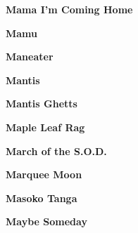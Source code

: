 \begin{center}\textbf{Mama I'm Coming Home}\end{center}
\newline
\vspace{10pt} 
\begin{center}\textbf{Mamu}\end{center}
\newline
\vspace{10pt} 
\begin{center}\textbf{Maneater}\end{center}
\newline
\vspace{10pt} 
\begin{center}\textbf{Mantis}\end{center}
\newline
\vspace{10pt} 
\begin{center}\textbf{Mantis Ghetts}\end{center}
\newline
\vspace{10pt} 
\begin{center}\textbf{Maple Leaf Rag}\end{center}
\newline
\vspace{10pt} 
\begin{center}\textbf{March of the S.O.D.}\end{center}
\newline
\vspace{10pt} 
\begin{center}\textbf{Marquee Moon}\end{center}
\newline
\vspace{10pt} 
\begin{center}\textbf{Masoko Tanga}\end{center}
\newline
\vspace{10pt} 
\begin{center}\textbf{Maybe Someday}\end{center}
\newline
